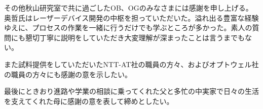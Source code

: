 \documentclass[11pt,dvipdfmx]{jreport}
\begin{document}
その他秋山研究室で共に過ごしたOB、OGのみなさまには感謝を申し上げる。
奥哲氏はレーザーデバイス開発の中枢を担っていただいた。溢れ出る豊富な経験ゆえに、プロセスの作業を一緒に行うだけでも学ぶところが多かった。素人の質問にも懇切丁寧に説明をしていただき大変理解が深まったことは言うまでもない。


また試料提供をしていただいたNTT-AT社の職員の方々、およびオプトウェル社の職員の方々にも感謝の意を示したい。


最後にときおり進路や学業の相談に乗ってくれた父と多忙の中実家で日々の生活を支えてくれた母に感謝の意を表して締めとしたい。

\end{document}
